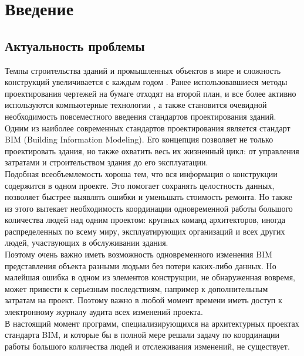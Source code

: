 \documentclass[a4paper,14pt]{extreport} %
\begin{document}
\tableofcontents %

\newpage
\chapter{Введение}
\section{Актуальность проблемы}

Темпы строительства зданий и промышленных объектов в мире и сложность конструкций увеличивается с каждым годом \cite{BUILDING_GROWTH_RATE}. Ранее использовавшиеся методы проектирования чертежей на бумаге отходят на второй план, и все более активно используются компьютерные технологии \cite{BUILDING_SOFTWARE}, а также становится очевидной необходимость повсеместного введения стандартов проектирования зданий. \\
Одним из наиболее современных стандартов проектирования является стандарт BIM (Building Information Modeling)\cite{BIM_FUTURE}. Его концепция позволяет не только проектировать здания, но также охватить весь их жизненный цикл: от управления затратами и строительством здания до его эксплуатации. \\
Подобная всеобъемлемость хороша тем, что вся информация о конструкции содержится в одном проекте. Это помогает сохранять целостность данных, позволяет быстрее выявлять ошибки и уменьшать стоимость ремонта. Но также из этого вытекает необходимость координации одновременной работы большого количества людей над одним проектом: крупных команд архитекторов, иногда распределенных по всему миру, эксплуатирующих организаций и всех других людей, участвующих в обслуживании здания. \\
Поэтому очень важно иметь возможность одновременного изменения BIM представления объекта разными людьми без потери каких-либо данных. Но малейшая ошибка в одном из элементов конструкции, не обнаруженная вовремя, может привести к серьезным последствиям, например к дополнительным затратам на проект. Поэтому важно в любой момент времени иметь доступ к электронному журналу аудита всех изменений проекта. \\
В настоящий момент программ, специализирующихся на архитектурных проектах стандарта BIM, и  которые бы в полной мере решали задачу по координации работы большого количества людей и отслеживания изменений, не существует. 

\newpage 
\end{document}
